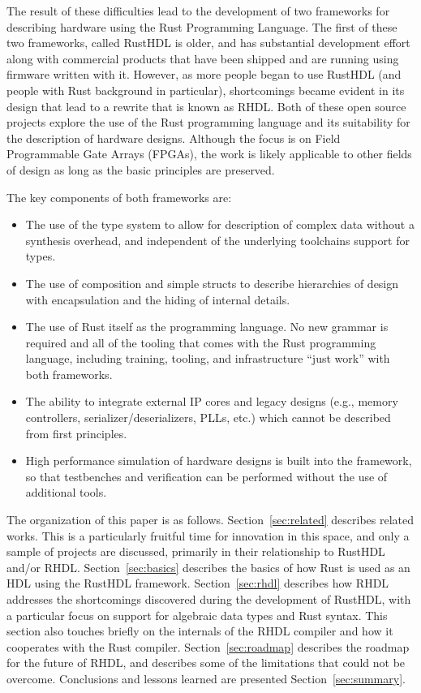 \documentclass[conference]{IEEEtran}
\begin{document}
The result of these difficulties lead to the development of two frameworks for describing
hardware using the Rust Programming Language.  The first of these two frameworks, called
RustHDL is older, and has substantial development effort along with commercial products
that have been shipped and are running using firmware written with it.  However, as more
people began to use RustHDL (and people with Rust background in particular), shortcomings
became evident in its design that lead to a rewrite that is known as RHDL.  Both of
these open source projects explore the use of the Rust programming language and its
suitability for the description of hardware designs.  Although the focus is on Field Programmable
Gate Arrays (FPGAs), the work is likely applicable to other fields of design as long as
the basic principles are preserved.

The key components of both frameworks are:
\begin{itemize}
\item The use of the type system to allow for description of complex data without
  a synthesis overhead, and independent of the underlying toolchains support for
  types.
\item The use of composition and simple structs to describe hierarchies of design
  with encapsulation and the hiding of internal details.
\item The use of Rust itself as the programming language.  No new grammar is required
  and all of the tooling that comes with the Rust programming language, including training,
  tooling, and infrastructure ``just work'' with both frameworks.
\item The ability to integrate external IP cores and legacy designs (e.g., memory controllers,
  serializer/deserializers, PLLs, etc.) which cannot be described from first principles.
\item High performance simulation of hardware designs is built into the framework, so that
  testbenches and verification can be performed without the use of additional tools.
\end{itemize}

The organization of this paper is as follows.  Section~\ref{sec:related} describes related
works.  This is a particularly fruitful time for innovation in this space, and only a
sample of projects are discussed, primarily in their relationship to RustHDL and/or RHDL.
Section~\ref{sec:basics} describes the basics of how Rust is used as an HDL using the RustHDL
framework.  Section~\ref{sec:rhdl} describes how RHDL addresses the shortcomings discovered
during the development of RustHDL, with a particular focus on support for algebraic data types
and Rust syntax.  This section also touches briefly on the internals of the RHDL compiler and
how it cooperates with the Rust compiler.  Section~\ref{sec:roadmap} describes the roadmap for
the future of RHDL, and describes some of the limitations that could not be overcome.  Conclusions
and lessons learned are presented Section~\ref{sec:summary}.
\end{document}
